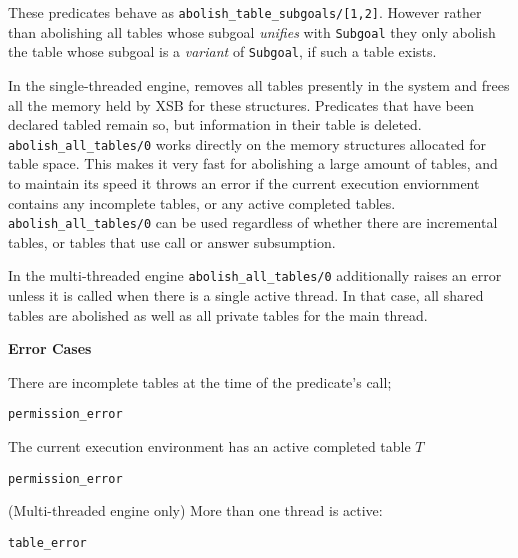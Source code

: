 \begin{description}
\begin{description}

%
These predicates behave as {\tt abolish\_table\_subgoals/[1,2]}.
However rather than abolishing all tables whose subgoal {\em unifies}
with {\tt Subgoal} they only abolish the table whose subgoal is a {\em
  variant} of {\tt Subgoal}, if such a table exists.


%
In the single-threaded engine, removes all tables presently in the
system and frees all the memory held by XSB for these structures.
Predicates that have been declared tabled remain so, but information
in their table is deleted.  {\tt abolish\_all\_tables/0} works
directly on the memory structures allocated for table space.  This
makes it very fast for abolishing a large amount of tables, and to
maintain its speed it throws an error if the current execution
enviornment contains any incomplete tables, or any active completed
tables.  {\tt abolish\_all\_tables/0} can be used regardless of
whether there are incremental tables, or tables that use call or
answer subsumption.

In the multi-threaded engine {\tt abolish\_all\_tables/0} additionally
raises an error unless it is called when there is a single active
thread.  In that case, all shared tables are abolished as well as all
private tables for the main thread.



{\bf Error Cases}
\bi
\item There are incomplete tables at the time of the predicate's call;
\bi
\item 	{\tt permission\_error}
\ei
\item The current execution environment has an active completed table $T$
\bi
\item 	{\tt permission\_error}
\ei
\item (Multi-threaded engine only) More than one thread is active:
\bi
\item 	{\tt table\_error}
\ei
%
%
\ei


\end{description}
\end{description}
